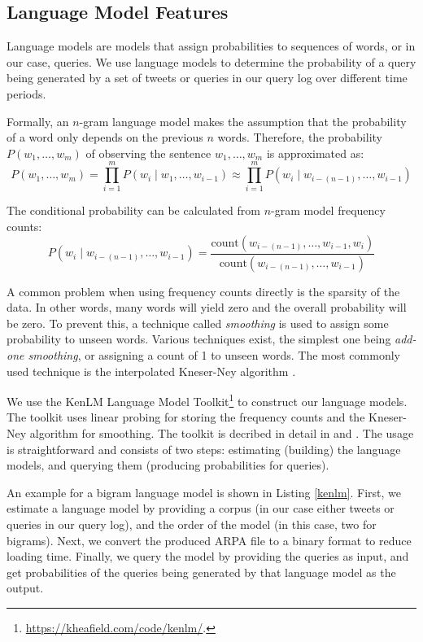 \subsection{Language Model Features}

Language models are models that assign probabilities to sequences of words, or in our case, queries. We use language models to determine the probability of a query being generated by a set of tweets or queries in our query log over different time periods.

Formally, an $n$-gram language model makes the assumption that the probability of a word only depends on the previous $n$ words. Therefore, the probability $P(w_{1},\ldots ,w_{m})$ of observing the sentence $w_{1},\ldots ,w_{m}$ is approximated as:
\[ P(w_{1},\ldots ,w_{m})=\prod _{{i=1}}^{m}P(w_{i}\mid w_{1},\ldots ,w_{{i-1}})\approx \prod _{{i=1}}^{m}P(w_{i}\mid w_{{i-(n-1)}},\ldots ,w_{{i-1}}) \]

\noindent The conditional probability can be calculated from $n$-gram model frequency counts:
\[ P(w_{i}\mid w_{{i-(n-1)}},\ldots ,w_{{i-1}})={\frac  {{\mathrm  {count}}(w_{{i-(n-1)}},\ldots ,w_{{i-1}},w_{i})}{{\mathrm  {count}}(w_{{i-(n-1)}},\ldots ,w_{{i-1}})}} \]

A common problem when using frequency counts directly is the sparsity of the data. In other words, many words will yield zero and the overall probability will be zero. To prevent this, a technique called \textit{smoothing} is used to assign some probability to unseen words. Various techniques exist, the simplest one being \textit{add-one smoothing}, or assigning a count of 1 to unseen words. The most commonly used technique is the interpolated Kneser-Ney algorithm \citep{kneser1995improved}.

We use the KenLM Language Model Toolkit\footnote{\url{https://kheafield.com/code/kenlm/}.} to construct our language models. The toolkit uses linear probing for storing the frequency counts and the Kneser-Ney algorithm for smoothing. The toolkit is decribed in detail in \citep{Heafield-kenlm} and \citep{Heafield-estimate}. The usage is straightforward and consists of two steps: estimating (building) the language models, and querying them (producing probabilities for queries).

An example for a bigram language model is shown in Listing \ref{kenlm}. First, we estimate a language model by providing a corpus (in our case either tweets or queries in our query log), and the order of the model (in this case, two for bigrams). Next, we convert the produced ARPA file to a binary format to reduce loading time. Finally, we query the model by providing the queries as input, and get probabilities of the queries being generated by that language model as the output.

